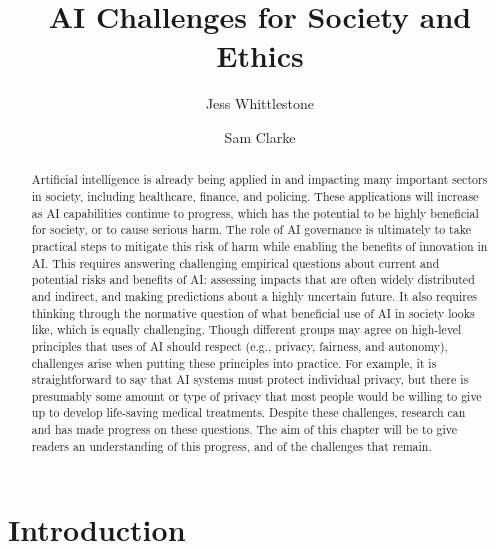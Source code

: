 \documentclass{article}
\title{AI Challenges for Society and Ethics}
\date{}
\author[1,2]{Jess Whittlestone}
\author[1]{Sam Clarke}
\affil[1]{Leverhulme Centre for the Future of Intelligence, University of Cambridge}
\affil[2]{Centre for the Study of Existential Risk, University of Cambridge}
\begin{document}
\maketitle


\begin{abstract}

Artificial intelligence is already being applied in and impacting many important sectors in society, including healthcare, finance, and policing. These applications will increase as AI capabilities continue to progress, which has the potential to be highly beneficial for society, or to cause serious harm. The role of AI governance is ultimately to take practical steps to mitigate this risk of harm while enabling the benefits of innovation in AI. This requires answering challenging empirical questions about current and potential risks and benefits of AI: assessing impacts that are often widely distributed and indirect, and making predictions about a highly uncertain future. It also requires thinking through the normative question of what beneficial use of AI in society looks like, which is equally challenging. Though different groups may agree on high-level principles that uses of AI should respect (e.g., privacy, fairness, and autonomy), challenges arise when putting these principles into practice. For example, it is straightforward to say that AI systems must protect individual privacy, but there is presumably some amount or type of privacy that most people would be willing to give up to develop life-saving medical treatments. Despite these challenges, research can and has made progress on these questions. The aim of this chapter will be to give readers an understanding of this progress, and of the challenges that remain.


\end{abstract}

\tableofcontents

\section{Introduction}
\end{document}
